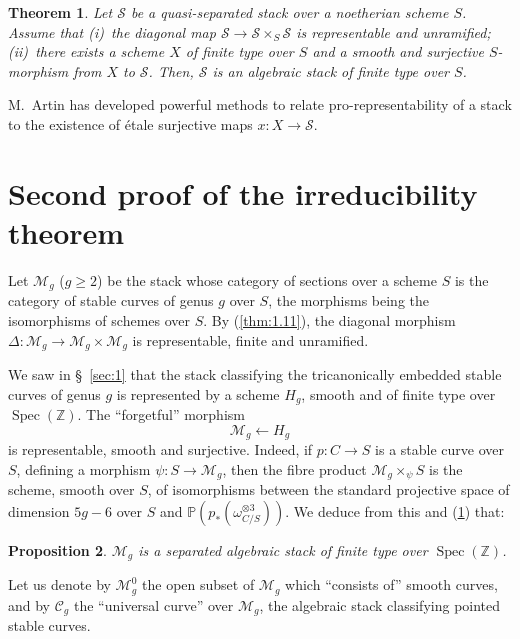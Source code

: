 \documentclass[10pt]{amsart}
\theoremstyle{plain}
\newtheorem{theorem}{Theorem}[section]
\newtheorem{proposition}[theorem]{Proposition}
\theoremstyle{definition}
\DeclareMathOperator{\Spec}{Spec}
\begin{document}
\begin{theorem}\label{thm:4.21}
Let $\mathscr{S}$ be a quasi-separated stack over a noetherian scheme $S$. Assume that (i)~the diagonal map $\mathscr{S} \to \mathscr{S} \times_S \mathscr{S}$ is representable and unramified; (ii)~there exists a scheme $X$ of finite type over $S$ and a smooth and surjective $S$-morphism from $X$ to $\mathscr{S}$. Then, $\mathscr{S}$ is an algebraic stack of finite type over $S$.
\end{theorem}

M.~Artin has developed powerful methods to relate pro-representability of a stack to the existence of \'etale surjective maps $x: X \to \mathscr{S}$.

\section{Second proof of the irreducibility theorem}\label{sec:5}

Let $\mathscr{M}_g$ ($g \geq 2$) be the stack whose category of sections over a scheme $S$ is the category of stable curves of genus $g$ over $S$, the morphisms being the isomorphisms of schemes over $S$. By (\ref{thm:1.11}), the diagonal morphism $\Delta: \mathscr{M}_g \to \mathscr{M}_g \times \mathscr{M}_g$ is representable, finite and unramified.

We saw in \S~\ref{sec:1} that the stack classifying the tricanonically embedded stable curves of genus $g$ is represented by a scheme $H_g$, smooth and of finite type over $\Spec(\mathbb{Z})$. The ``forgetful'' morphism
\[
\mathscr{M}_g \longleftarrow H_g
\]
is representable, smooth and surjective. Indeed, if $p: C \to S$ is a stable curve over $S$, defining a morphism $\psi: S \to \mathscr{M}_g$, then the fibre product $\mathscr{M}_g \times_\psi S$ is the scheme, smooth over $S$, of isomorphisms between the standard projective space of dimension $5g-6$ over $S$ and $\mathbb{P}(p_*(\omega_{C/S}^{\otimes 3}))$. We deduce from this and (\ref{thm:4.21}) that:

\begin{proposition}\label{prop:5.1}
$\mathscr{M}_g$ is a separated algebraic stack of finite type over $\Spec(\mathbb{Z})$.
\end{proposition}

Let us denote by $\mathscr{M}_g^0$ the open subset of $\mathscr{M}_g$ which ``consists of'' smooth curves, and by $\mathscr{C}_g$ the ``universal curve'' over $\mathscr{M}_g$, the algebraic stack classifying pointed stable curves.
\end{document}
